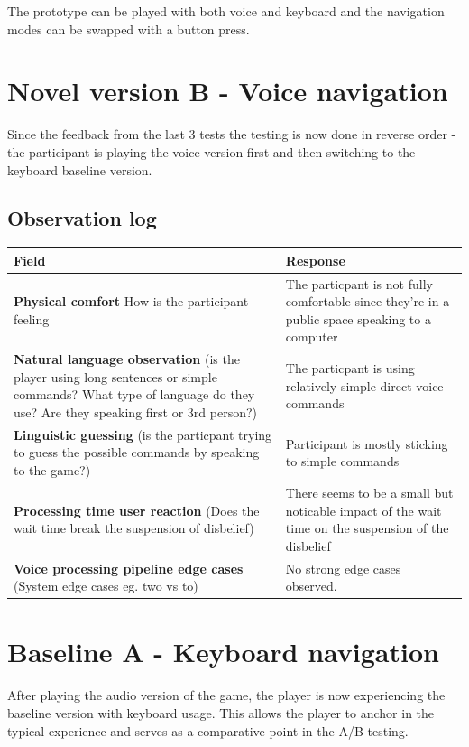 The prototype can be played with both voice and keyboard and the navigation modes can be swapped with a button press. 


\section{Novel version B - Voice navigation}

Since the feedback from the last 3 tests the testing is now done in reverse order - the participant is playing the voice version first and then switching to the keyboard baseline version.


\subsection{Observation log}
\begin{table}[H]
\centering
\begin{tabular}{|p{5cm}|p{10cm}|}
\hline
\textbf{Field} & \textbf{Response} \\ \hline
\textbf{Physical comfort} How is the participant feeling & The particpant is not fully comfortable since they're in a public space speaking to a computer\\[1.5cm] \hline
\textbf{Natural language observation} (is the player using long sentences or simple commands? What type of language do they use? Are they speaking first or 3rd person?) & The particpant is using relatively simple direct voice commands\\[1.5cm] \hline
\textbf{Linguistic guessing} (is the particpant trying to guess the possible commands by speaking to the game?) & Participant is mostly sticking to simple commands \\[1.5cm] \hline
\textbf{Processing time user reaction} (Does the wait time break the suspension of disbelief) & There seems to be a small but noticable impact of the wait time on the suspension of the disbelief\\[1.5cm] \hline
\textbf{Voice processing pipeline edge cases} (System edge cases eg. two vs to)& No strong edge cases observed.\\[1.5cm] \hline
\end{tabular}
\end{table}


\section{Baseline A - Keyboard navigation}
After playing the audio version of the game, the player is now experiencing the baseline version with keyboard usage.
This allows the player to anchor in the typical experience and serves as a comparative point in the A/B testing.

